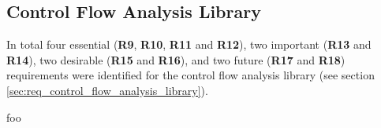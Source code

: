 
\subsection{Control Flow Analysis Library}
\label{sec:eval_control_flow_analysis_library}

In total four essential (\textbf{R9}, \textbf{R10}, \textbf{R11} and \textbf{R12}), two important (\textbf{R13} and \textbf{R14}), two desirable (\textbf{R15} and \textbf{R16}), and two future (\textbf{R17} and \textbf{R18}) requirements were identified for the control flow analysis library (see section \ref{sec:req_control_flow_analysis_library}).






foo
